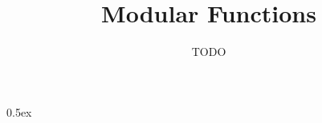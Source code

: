 \documentclass[11pt,a4paper]{book}
\begin{document}
\title{Modular Functions}
\author{TODO}
\maketitle

\tableofcontents
\parindent 0pt\parskip 0.5ex



\nocite{apostol2012modular}



\end{document}
